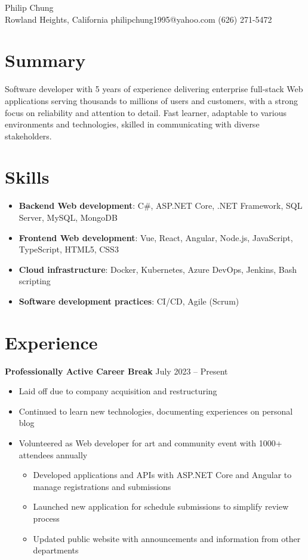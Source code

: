 \documentclass[12pt]{article}
\newcommand{\titleheader}[2]{\textbf{#1} \symbol{"B7} #2}
\begin{document}
	\begin{center}
		{\headerfont\fontsize{24pt}{24pt}\selectfont Philip Chung} \\ \vspace{0.5em}
		Rowland Heights, California  philipchung1995@yahoo.com  (626) 271-5472
	\end{center}

	\section*{Summary}

	Software developer with 5 years of experience delivering enterprise full-stack Web applications serving thousands to millions of users and customers, with a strong focus on reliability and attention to detail. Fast learner, adaptable to various environments and technologies, skilled in communicating with diverse stakeholders.

	\section*{Skills}

	\newcommand{\skillitem}[2]{\item \textbf{#1}: #2}

	\begin{itemize}[left=0.25in .. 0.25in,label={},itemindent=-0.25in]
		\skillitem{Backend Web development}{C\#, ASP.NET Core, .NET Framework, SQL Server, MySQL, MongoDB}
		\skillitem{Frontend Web development}{Vue, React, Angular, Node.js, JavaScript, TypeScript, HTML5, CSS3}
		\skillitem{Cloud infrastructure}{Docker, Kubernetes, Azure DevOps, Jenkins, Bash scripting}
		\skillitem{Software development practices}{CI/CD, Agile (Scrum)}
	\end{itemize}

	\section*{Experience}

	\titleheader{Professionally Active Career Break}{July 2023 -- Present}

	\begin{itemize}
		\item Laid off due to company acquisition and restructuring
		\item Continued to learn new technologies, documenting experiences on personal blog
		\item Volunteered as Web developer for art and community event with 1000+ attendees annually
		\begin{itemize}
			\item Developed applications and APIs with ASP.NET Core and Angular to manage registrations and submissions
			\item Launched new application for schedule submissions to simplify review process
			\item Updated public website with announcements and information from other departments
		\end{itemize}
	\end{itemize}
\end{document}
